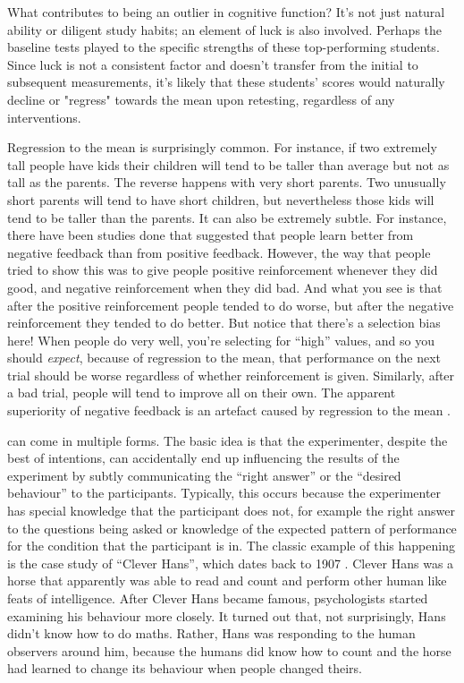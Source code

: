 What contributes to being an outlier in cognitive function? It's not just natural ability or diligent study habits; an element of luck is also involved. Perhaps the baseline tests played to the specific strengths of these top-performing students. Since luck is not a consistent factor and doesn't transfer from the initial to subsequent measurements, it's likely that these students' scores would naturally decline or "regress" towards the mean upon retesting, regardless of any interventions.

Regression to the mean is surprisingly common. For instance, if two extremely tall people have kids their children will tend to be taller than average but not as tall as the parents. The reverse happens with very short parents. Two unusually short parents will tend to have short children, but nevertheless those kids will tend to be taller than the parents. It can also be extremely subtle. For instance, there have been studies done that suggested that people learn better from negative feedback than from positive feedback. However, the way that people tried to show this was to give people positive reinforcement whenever they did good, and negative reinforcement when they did bad. And what you see is that after the positive reinforcement people tended to do worse, but after the negative reinforcement they tended to do better. But notice that there's a selection bias here! When people do very well, you're selecting for ``high'' values, and so you should {\it expect}, because of regression to the mean, that performance on the next trial should be worse regardless of whether reinforcement is given. Similarly, after a bad trial, people will tend to improve all on their own. The apparent superiority of negative feedback is an artefact caused by regression to the mean \parencite[see][for discussion]{Kahneman1973}.


 can come in multiple forms. The basic idea is that the experimenter, despite the best of intentions, can accidentally end up influencing the results of the experiment by subtly communicating the ``right answer'' or the ``desired behaviour'' to the participants. Typically, this occurs because the experimenter has special knowledge that the participant does not, for example the right answer to the questions being asked or knowledge of the expected pattern of performance for the condition that the participant is in. The classic example of this happening is the case study of ``Clever Hans'', which dates back to 1907 \parencite{Pfungst1911,Hothersall2004}. Clever Hans was a horse that apparently was able to read and count and perform other human like feats of intelligence. After Clever Hans became famous, psychologists started examining his behaviour more closely. It turned out that, not surprisingly, Hans didn't know how to do maths. Rather, Hans was responding to the human observers around him, because the humans did know how to count and the horse had learned to change its behaviour when people changed theirs. 

